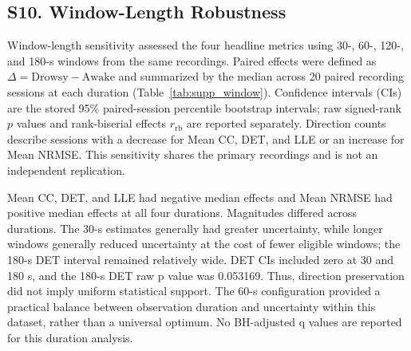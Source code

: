 \begingroup
\renewcommand{\thetable}{S\arabic{table}}
\renewcommand{\thefigure}{S\arabic{figure}}
\setcounter{table}{7}
\setcounter{figure}{6}
\subsection*{S10. Window-Length Robustness}
Window-length sensitivity assessed the four headline metrics using 30-, 60-, 120-, and 180-s windows from the same recordings. Paired effects were defined as $\Delta=\mathrm{Drowsy}-\mathrm{Awake}$ and summarized by the median across 20 paired recording sessions at each duration (Table~\ref{tab:supp_window}). Confidence intervals (CIs) are the stored 95\% paired-session percentile bootstrap intervals; raw signed-rank $p$ values and rank-biserial effects $r_{\mathrm{rb}}$ are reported separately. Direction counts describe sessions with a decrease for Mean CC, DET, and LLE or an increase for Mean NRMSE. This sensitivity shares the primary recordings and is not an independent replication.

Mean CC, DET, and LLE had negative median effects and Mean NRMSE had positive median effects at all four durations. Magnitudes differed across durations. The 30-s estimates generally had greater uncertainty, while longer windows generally reduced uncertainty at the cost of fewer eligible windows; the 180-s DET interval remained relatively wide. DET CIs included zero at 30 and 180 s, and the 180-s DET raw p value was 0.053169. Thus, direction preservation did not imply uniform statistical support. The 60-s configuration provided a practical balance between observation duration and uncertainty within this dataset, rather than a universal optimum. No BH-adjusted q values are reported for this duration analysis.

